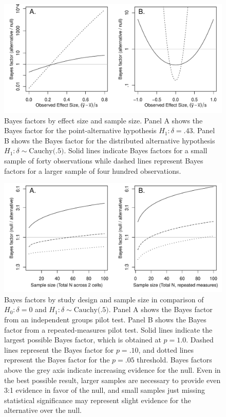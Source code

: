 \documentclass[man]{apa6}
\begin{document}
\begin{figure}
\includegraphics[width=\textwidth, keepaspectratio]{BFfigure2.pdf}
\caption{Bayes factors by effect size and sample size. Panel A shows the Bayes factor for the point-alternative hypothesis $H_1: \delta = .43$. Panel B shows the Bayes factor for the distributed alternative hypothesis $H_1: \delta \sim \mbox{Cauchy(.5)}$. Solid lines indicate Bayes factors for a small sample of forty observations while dashed lines represent Bayes factors for a larger sample of four hundred observations.}
\label{BFNfig}
\end{figure}

\begin{figure}
\includegraphics[width=\textwidth, keepaspectratio]{BFminmax.pdf}
\caption{Bayes factors by study design and sample size in comparison of $H_0: \delta = 0$ and $H_1: \delta \sim \mbox{Cauchy(.5)}$. Panel A shows the Bayes factor from an independent groups pilot test. Panel B shows the Bayes factor from a repeated-measures pilot test. Solid lines indicate the largest possible Bayes factor, which is obtained at $p = 1.0$. Dashed lines represent the Bayes factor for $p = .10$, and dotted lines represent the Bayes factor for the $p = .05$ threshold. Bayes factors above the grey axis indicate increasing evidence for the null. Even in the best possible result, larger samples are necessary to provide even 3:1 evidence in favor of the null, and small samples just missing statistical significance may represent slight evidence for the alternative over the null.}
\label{BFMinMax}
\end{figure}
\end{document}
